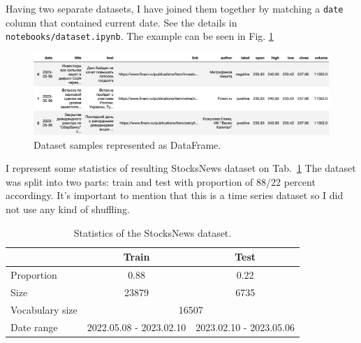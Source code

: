 \documentclass{article}
\begin{document}
Having two separate datasets, I have joined them together by matching a \texttt{date} column that contained current date. 
See the details in \texttt{notebooks/dataset.ipynb}. The example can be seen in Fig. \ref{fig:dataset}

\begin{figure}[!tbh]
    \centering
    \includegraphics[width=0.9\linewidth]{dataset.png}
    \caption{Dataset samples represented as DataFrame.}
    \label{fig:dataset}
\end{figure}

I represent some statistics of resulting StocksNews dataset on Tab.~\ref{tab:statistics} The dataset was split into two parts: train and test with proportion of 88/22 percent accordingy. It's important to mention that this is a time series dataset so I did not use any kind of shuffling. 

\begin{table}[tbh!]
\begin{center}
\begin{tabular}[t]{|l|c|c|}
\hline
 & Train & Test \\
\hline
\hline
Proportion & 0.88 & 0.22  \\
\hline
Size & 23879 & 6735 \\
\hline
Vocabulary size & \multicolumn{2}{c|}{16507} \\
\hline
Date range & 2022.05.08 - 2023.02.10 & 2023.02.10 - 2023.05.06 \\
\hline
\end{tabular}
\caption{Statistics of the StocksNews dataset.}
\label{tab:statistics}
\end{center}
\end{table}
\end{document}
